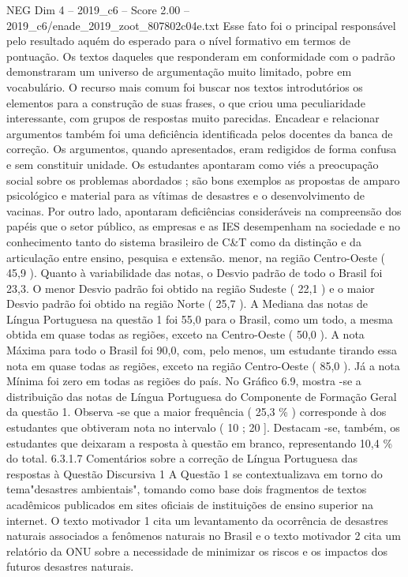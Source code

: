 \begin{textsample}{NEG Dim 4 – 2019\_c6 – Score 2.00 – 2019\_c6/enade\_2019\_zoot\_807802c04e.txt}
Esse fato foi o principal responsável pelo resultado aquém do esperado para o nível formativo em termos de pontuação.
Os textos daqueles que responderam em conformidade com o padrão demonstraram um universo de argumentação muito limitado, pobre em vocabulário.
O recurso mais comum foi buscar nos textos introdutórios os elementos para a construção de suas frases, o que criou uma peculiaridade interessante, com grupos de respostas muito parecidas.
Encadear e relacionar argumentos também foi uma deficiência identificada pelos docentes da banca de correção.
Os argumentos, quando apresentados, eram redigidos de forma confusa e sem constituir unidade.
Os estudantes apontaram como viés a preocupação social sobre os problemas abordados ; são bons exemplos as propostas de amparo psicológico e material para as vítimas de desastres e o desenvolvimento de vacinas.
Por outro lado, apontaram deficiências consideráveis na compreensão dos papéis que o setor público, as empresas e as IES desempenham na sociedade e no conhecimento tanto do sistema brasileiro de C\&T como da distinção e da articulação entre ensino, pesquisa e extensão. menor, na região Centro-Oeste ( 45,9 ).
Quanto à variabilidade das notas, o Desvio padrão de todo o Brasil foi 23,3.
O menor Desvio padrão foi obtido na região Sudeste ( 22,1 ) e o maior Desvio padrão foi obtido na região Norte ( 25,7 ).
A Mediana das notas de Língua Portuguesa na questão 1 foi 55,0 para o Brasil, como um todo, a mesma obtida em quase todas as regiões, exceto na Centro-Oeste ( 50,0 ).
A nota Máxima para todo o Brasil foi 90,0, com, pelo menos, um estudante tirando essa nota em quase todas as regiões, exceto na região Centro-Oeste ( 85,0 ).
Já a nota Mínima foi zero em todas as regiões do país.
No Gráfico 6.9, mostra -se a distribuição das notas de Língua Portuguesa do Componente de Formação Geral da questão 1.
Observa -se que a maior frequência ( 25,3 \% ) corresponde à dos estudantes que obtiveram nota no intervalo ( 10 ; 20 ].
Destacam -se, também, os estudantes que deixaram a resposta à questão em branco, representando 10,4 \% do total. 6.3.1.7 Comentários sobre a correção de Língua Portuguesa das respostas à Questão Discursiva 1 A Questão 1 se contextualizava em torno do tema"desastres ambientais", tomando como base dois fragmentos de textos acadêmicos publicados em sites oficiais de instituições de ensino superior na internet.
O texto motivador 1 cita um levantamento da ocorrência de desastres naturais associados a fenômenos naturais no Brasil e o texto motivador 2 cita um relatório da ONU sobre a necessidade de minimizar os riscos e os impactos dos futuros desastres naturais.

\end{textsample}
